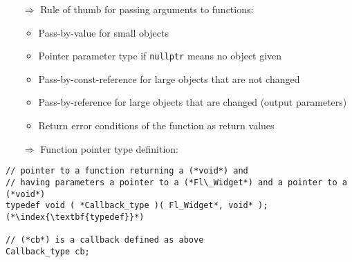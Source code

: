 \documentclass[10pt]{article}
\begin{document}
\begin{enumerate}
\item[$\Rightarrow$] Rule of thumb for passing arguments to functions:
\begin{itemize}
\item Pass-by-value for small objects
\item Pointer parameter type if \texttt{nullptr} means no object given
\item Pass-by-const-reference for large objects that are not changed
\item Pass-by-reference for large objects that are changed (output parameters)
\item Return error conditions of the function as return values
\end{itemize}
\end{enumerate}
\begin{enumerate}
\item[$\Rightarrow$] Function pointer type definition:
\end{enumerate}
\begin{lstlisting}
// pointer to a function returning a (*void*) and
// having parameters a pointer to a (*Fl\_Widget*) and a pointer to a (*void*)
typedef void ( *Callback_type )( Fl_Widget*, void* ); (*\index{\textbf{typedef}}*)

// (*cb*) is a callback defined as above
Callback_type cb;
\end{lstlisting}
%
%
\end{document}
